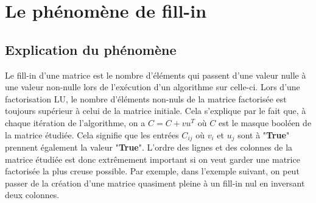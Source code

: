 \documentclass[11pt]{article}
\begin{document}
\section{Le phénomène de fill-in}
\subsection{Explication du phénomène}
Le fill-in d'une matrice est le nombre d'éléments qui passent d'une valeur nulle à une valeur non-nulle lors de l'exécution d'un algorithme sur celle-ci. Lors d'une factorisation LU, le nombre d'éléments non-nuls de la matrice factorisée est toujours supérieur à celui de la matrice initiale. Cela s'explique par le fait que, à chaque itération de l'algorithme, on a $C = C + vu^T$ où $C$ est le masque booléen de la matrice étudiée. Cela signifie que les entrées $C_{ij}$ où $v_i$ et $u_j$ sont à "\textbf{True}" prennent également la valeur "\textbf{True}". L'ordre des lignes et des colonnes de la matrice étudiée est donc extrêmement important si on veut garder une matrice factorisée la plus creuse possible.
Par exemple, dans l'exemple suivant, on peut passer de la création d'une matrice quasiment pleine à un fill-in nul en inversant deux colonnes.
\end{document}
